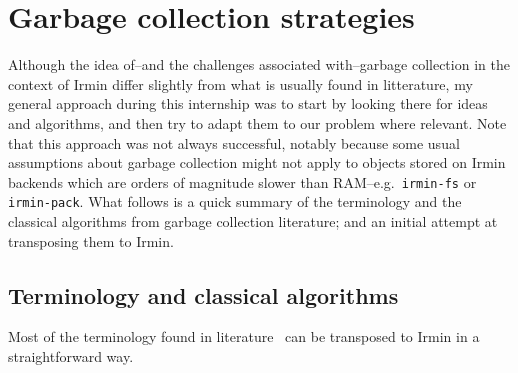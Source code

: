 \section{Garbage collection strategies}

Although the idea of--and the challenges associated with--garbage collection in the context of Irmin differ slightly from what is usually found in litterature, my general approach during this internship was to start by looking there for ideas and algorithms, and then try to adapt them to our problem where relevant. Note that this approach was not always successful, notably because some usual assumptions about garbage collection might not apply to objects stored on Irmin backends which are orders of magnitude slower than RAM--e.g.~\texttt{irmin-fs} or \texttt{irmin-pack}. What follows is a quick summary of the terminology and the classical algorithms from garbage collection literature; and an initial attempt at transposing them to Irmin.

\subsection{Terminology and classical algorithms}

Most of the terminology found in literature~\cite{handbook} can be transposed to Irmin in a straightforward way.

